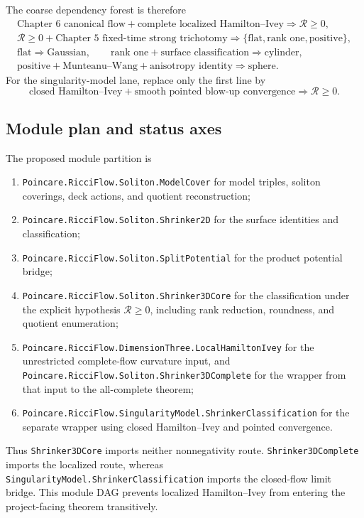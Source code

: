 \documentclass[10pt]{coll-l}
\theoremstyle{definition}
\theoremstyle{remark}
\numberwithin{section}{chapter}
\numberwithin{equation}{chapter}
\begin{document}
The coarse dependency forest is therefore
\begin{equation}
\begin{gathered}
 \text{Chapter~6 canonical flow}+\text{complete localized Hamilton--Ivey}
       \Longrightarrow \mathcal R\geq0,\\
 \mathcal R\geq0+\text{Chapter~5 fixed-time strong trichotomy}
       \Longrightarrow \{\text{flat},\text{rank one},\text{positive}\},\\
 \text{flat}\Longrightarrow\text{Gaussian},\qquad
 \text{rank one}+\text{surface classification}\Longrightarrow\text{cylinder},\\
 \text{positive}+\text{Munteanu--Wang}+\text{anisotropy identity}
       \Longrightarrow\text{sphere}.
\end{gathered}                                             \label{eq:shrinker-classification-coarse-forest}
\end{equation}
For the singularity-model lane, replace only the first line by
\[
 \text{closed Hamilton--Ivey}+\text{smooth pointed blow-up convergence}
       \Longrightarrow\mathcal R\geq0.
\]

\subsection*{Module plan and status axes}

\begin{sloppypar}
The proposed module partition is
\begin{enumerate}
\item \nolinkurl{Poincare.RicciFlow.Soliton.ModelCover} for model triples,
      soliton coverings, deck actions, and quotient reconstruction;
\item \nolinkurl{Poincare.RicciFlow.Soliton.Shrinker2D} for the surface
      identities and classification;
\item \nolinkurl{Poincare.RicciFlow.Soliton.SplitPotential} for the product
      potential bridge;
\item \nolinkurl{Poincare.RicciFlow.Soliton.Shrinker3DCore} for the
      classification under the explicit hypothesis $\mathcal R\geq0$,
      including rank reduction, roundness, and quotient enumeration;
\item \nolinkurl{Poincare.RicciFlow.DimensionThree.LocalHamiltonIvey} for
      the unrestricted complete-flow curvature input, and
      \nolinkurl{Poincare.RicciFlow.Soliton.Shrinker3DComplete} for the
      wrapper from that input to the all-complete theorem;
\item \nolinkurl{Poincare.RicciFlow.SingularityModel.ShrinkerClassification}
      for the separate wrapper using closed Hamilton--Ivey and pointed
      convergence.
\end{enumerate}
Thus \nolinkurl{Shrinker3DCore} imports neither nonnegativity route.
\nolinkurl{Shrinker3DComplete} imports the localized route, whereas
\nolinkurl{SingularityModel.ShrinkerClassification} imports the closed-flow
limit bridge.  This module DAG prevents localized Hamilton--Ivey from
entering the project-facing theorem transitively.
\end{sloppypar}
\end{document}
